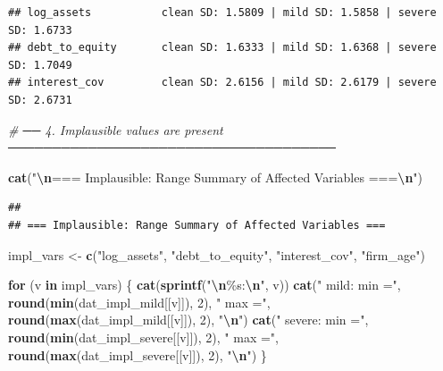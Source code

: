 \documentclass[
]{article}
\newenvironment{Shaded}{\begin{snugshade}}{\end{snugshade}}
\newcommand{\CommentTok}[1]{\textcolor[rgb]{0.56,0.35,0.01}{\textit{#1}}}
\newcommand{\ControlFlowTok}[1]{\textcolor[rgb]{0.13,0.29,0.53}{\textbf{#1}}}
\newcommand{\DecValTok}[1]{\textcolor[rgb]{0.00,0.00,0.81}{#1}}
\newcommand{\FunctionTok}[1]{\textcolor[rgb]{0.13,0.29,0.53}{\textbf{#1}}}
\newcommand{\NormalTok}[1]{#1}
\newcommand{\OtherTok}[1]{\textcolor[rgb]{0.56,0.35,0.01}{#1}}
\newcommand{\SpecialCharTok}[1]{\textcolor[rgb]{0.81,0.36,0.00}{\textbf{#1}}}
\newcommand{\StringTok}[1]{\textcolor[rgb]{0.31,0.60,0.02}{#1}}
\begin{document}
\begin{verbatim}
## log_assets           clean SD: 1.5809 | mild SD: 1.5858 | severe SD: 1.6733
## debt_to_equity       clean SD: 1.6333 | mild SD: 1.6368 | severe SD: 1.7049
## interest_cov         clean SD: 2.6156 | mild SD: 2.6179 | severe SD: 2.6731
\end{verbatim}

\begin{Shaded}
\begin{Highlighting}[]
\CommentTok{\# ── 4. Implausible values are present ─────────────────────────────────────}

\FunctionTok{cat}\NormalTok{(}\StringTok{"}\SpecialCharTok{\textbackslash{}n}\StringTok{=== Implausible: Range Summary of Affected Variables ===}\SpecialCharTok{\textbackslash{}n}\StringTok{"}\NormalTok{)}
\end{Highlighting}
\end{Shaded}

\begin{verbatim}
## 
## === Implausible: Range Summary of Affected Variables ===
\end{verbatim}

\begin{Shaded}
\begin{Highlighting}[]
\NormalTok{impl\_vars }\OtherTok{\textless{}{-}} \FunctionTok{c}\NormalTok{(}\StringTok{"log\_assets"}\NormalTok{, }\StringTok{"debt\_to\_equity"}\NormalTok{, }\StringTok{"interest\_cov"}\NormalTok{, }\StringTok{"firm\_age"}\NormalTok{)}

\ControlFlowTok{for}\NormalTok{ (v }\ControlFlowTok{in}\NormalTok{ impl\_vars) \{}
  \FunctionTok{cat}\NormalTok{(}\FunctionTok{sprintf}\NormalTok{(}\StringTok{"}\SpecialCharTok{\textbackslash{}n}\StringTok{\%s:}\SpecialCharTok{\textbackslash{}n}\StringTok{"}\NormalTok{, v))}
  \FunctionTok{cat}\NormalTok{(}\StringTok{"  mild:   min ="}\NormalTok{, }\FunctionTok{round}\NormalTok{(}\FunctionTok{min}\NormalTok{(dat\_impl\_mild[[v]]),  }\DecValTok{2}\NormalTok{),}
              \StringTok{" max ="}\NormalTok{, }\FunctionTok{round}\NormalTok{(}\FunctionTok{max}\NormalTok{(dat\_impl\_mild[[v]]),  }\DecValTok{2}\NormalTok{), }\StringTok{"}\SpecialCharTok{\textbackslash{}n}\StringTok{"}\NormalTok{)}
  \FunctionTok{cat}\NormalTok{(}\StringTok{"  severe: min ="}\NormalTok{, }\FunctionTok{round}\NormalTok{(}\FunctionTok{min}\NormalTok{(dat\_impl\_severe[[v]]), }\DecValTok{2}\NormalTok{),}
              \StringTok{" max ="}\NormalTok{, }\FunctionTok{round}\NormalTok{(}\FunctionTok{max}\NormalTok{(dat\_impl\_severe[[v]]), }\DecValTok{2}\NormalTok{), }\StringTok{"}\SpecialCharTok{\textbackslash{}n}\StringTok{"}\NormalTok{)}
\NormalTok{\}}
\end{Highlighting}
\end{Shaded}
\end{document}
